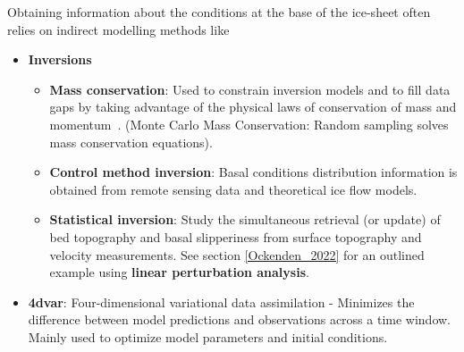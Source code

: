 Obtaining information about the conditions at the base of the ice-sheet often relies on indirect modelling methods like
\begin{itemize}

    \item\textbf{Inversions}
        \begin{itemize}
            \item\textbf{Mass conservation}: Used to constrain inversion models and to fill data gaps by taking advantage of the physical laws of conservation of mass and momentum~\cite{Morlighem_2017, Morlighem_2020}. (Monte Carlo Mass Conservation: Random sampling solves mass conservation equations\cite{Brinkerhoff_2016}).
            \item\textbf{Control method inversion}: Basal conditions distribution information is obtained from remote sensing data and theoretical ice flow models\cite{deRydt_2013}.
            \item\textbf{Statistical inversion}: Study the simultaneous retrieval (or update) of bed topography and basal slipperiness from surface topography and velocity measurements\cite{deRydt_2013}. See section \ref{Ockenden_2022} for an outlined example using \textbf{linear perturbation analysis}.
        \end{itemize}

    \item\textbf{4dvar}: Four-dimensional variational data assimilation - Minimizes the difference between model predictions and observations across a time window. Mainly used to optimize model parameters and initial conditions\cite{Morlighem_Goldberg_2024}.


\end{itemize}
